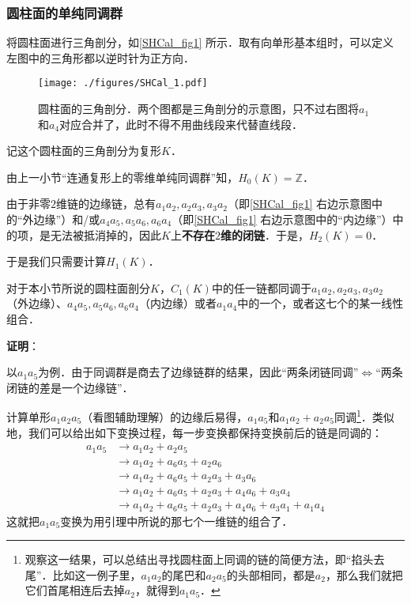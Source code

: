 \subsubsection{圆柱面的单纯同调群}

将圆柱面进行三角剖分，如\autoref{SHCal_fig1} 所示．取有向单形基本组时，可以定义左图中的三角形都以逆时针为正方向．

\begin{figure}[ht]
\centering
\texttt{[image: ./figures/SHCal\_1.pdf]}
\caption{圆柱面的三角剖分．两个图都是三角剖分的示意图，只不过右图将$a_1$和$a_4$对应合并了，此时不得不用曲线段来代替直线段．} \label{SHCal_fig1}
\end{figure}

记这个圆柱面的三角剖分为复形$K$．

由上一小节“连通复形上的零维单纯同调群”知，$H_0(K)=\mathbb{Z}$．

由于非零$2$维链的边缘链，总有$a_1a_2, a_2a_3, a_3a_2$（即\autoref{SHCal_fig1} 右边示意图中的“外边缘”）和/或$a_4a_5, a_5a_6, a_6a_4$（即\autoref{SHCal_fig1} 右边示意图中的“内边缘”）中的项，是无法被抵消掉的，因此$K$上\textbf{不存在}$2$\textbf{维的闭链}．于是，$H_2(K)=0$．

于是我们只需要计算$H_1(K)$．

\begin{lemma}{}\label{SHCal_lem2}
对于本小节所说的圆柱面剖分$K$，$C_1(K)$中的任一链都同调于$a_1a_2, a_2a_3, a_3a_2$（外边缘）、$a_4a_5, a_5a_6, a_6a_4$（内边缘）或者$a_1a_4$中的一个，或者这七个的某一线性组合．
\end{lemma}

\textbf{证明}：

以$a_1a_5$为例．由于同调群是商去了边缘链群的结果，因此“两条闭链同调”$\iff$“两条闭链的差是一个边缘链”．

计算单形$a_1a_2a_5$（看图辅助理解）的边缘后易得，$a_1a_5$和$a_1a_2+a_2a_5$同调\footnote{观察这一结果，可以总结出寻找圆柱面上同调的链的简便方法，即“掐头去尾”．比如这一例子里，$a_1a_2$的尾巴和$a_2a_5$的头部相同，都是$a_2$，那么我们就把它们首尾相连后去掉$a_2$，就得到$a_1a_5$．}．类似地，我们可以给出如下变换过程，每一步变换都保持变换前后的链是同调的：
\begin{equation}\label{SHCal_eq1}
\begin{aligned}
a_1a_5&\to a_1a_2+a_2a_5\\
&\to a_1a_2+a_6a_5+a_2a_6\\
&\to a_1a_2+a_6a_5+a_2a_3+a_3a_6\\&
\to a_1a_2+a_6a_5+a_2a_3+a_4a_6+a_3a_4\\
&\to a_1a_2+a_6a_5+a_2a_3+a_4a_6+a_3a_1+a_1a_4
\end{aligned}
\end{equation}
这就把$a_1a_5$变换为用引理中所说的那七个一维链的组合了．

